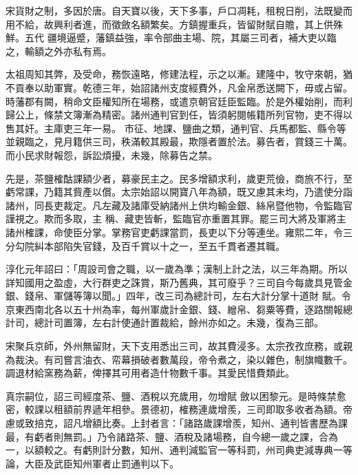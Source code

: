 
\begin{pinyinscope}

 宋貨財之制，多因於唐。自天寶以後，天下多事，戶口凋耗，租稅日削，法既變而用不給，故興利者進，而徵斂名額繁矣。方鎮握重兵，皆留財賦自贍，其上供殊鮮。五代
 疆境逼蹙，藩鎮益強，率令部曲主場、院，其屬三司者，補大吏以臨之，輸額之外亦私有焉。



 太祖周知其弊，及受命，務恢遠略，修建法程，示之以漸。建隆中，牧守來朝，猶不貢奉以助軍實。乾德三年，始詔諸州支度經費外，凡金帛悉送闕下，毋或占留。時藩郡有闕，稍命文臣權知所在場務，或遣京朝官廷臣監臨。於是外權始削，而利歸公上，條禁文簿漸為精密。諸州通判官到任，皆須躬閱帳籍所列官物，吏不得以售其奸。主庫吏三年一易。
 市征、地課、鹽曲之類，通判官、兵馬都監、縣令等並親臨之，見月籍供三司，秩滿較其殿最，欺隱者置於法。募告者，賞錢三十萬。而小民求財報怨，訴訟煩擾，未幾，除募告之禁。



 先是，茶鹽榷酤課額少者，募豪民主之。民多增額求利，歲更荒儉，商旅不行，至虧常課，乃籍其貲產以償。太宗始詔以開寶八年為額，既又慮其未均，乃遣使分詣諸州，同長吏裁定。凡左藏及諸庫受納諸州上供均輸金銀、絲帛暨他物，令監臨官謹視之。欺而多取，主
 稱、藏吏皆斬，監臨官亦重置其罪。罷三司大將及軍將主諸州榷課，命使臣分掌。掌務官吏虧課當罰，長吏以下分等連坐。雍熙二年，令三分勾院糾本部陷失官錢，及百千賞以十之一，至五千貫者遷其職。



 淳化元年詔曰：「周設司會之職，以一歲為準；漢制上計之法，以三年為期。所以詳知國用之盈虛，大行群吏之誅賞，斯乃舊典，其可廢乎？三司自今每歲具見管金銀、錢帛、軍儲等簿以聞。」四年，改三司為總計司，左右大計分掌十道財
 賦。令京東西南北各以五十州為率，每州軍歲計金銀、錢、繒帛、芻粟等費，逐路關報總計司，總計司置簿，左右計使通計置裁給，餘州亦如之。未幾，復為三部。



 宋聚兵京師，外州無留財，天下支用悉出三司，故其費浸多。太宗孜孜庶務，或親為裁決。有司嘗言油衣、帟幕損破者數萬段，帝令煮之，染以雜色，制旗幟數千。調退材給窯務為薪，俾擇其可用者造什物數千事。其愛民惜費類此。



 真宗嗣位，詔三司經度茶、鹽、酒稅以充歲用，勿增賦
 斂以困黎元。是時條禁愈密，較課以租額前界遞年相參。景德初，榷務連歲增羨，三司即取多收者為額。帝慮或致掊克，詔凡增額比奏。上封者言：「諸路歲課增羨，知州、通判皆書歷為課最，有虧者則無罰。」乃令諸路茶、鹽、酒稅及諸場務，自今總一歲之課，合為一，以額較之。有虧則計分數，知州、通判減監官一等科罰，州司典吏減專典一等論，大臣及武臣知州軍者止罰通判以下。




\end{pinyinscope}
